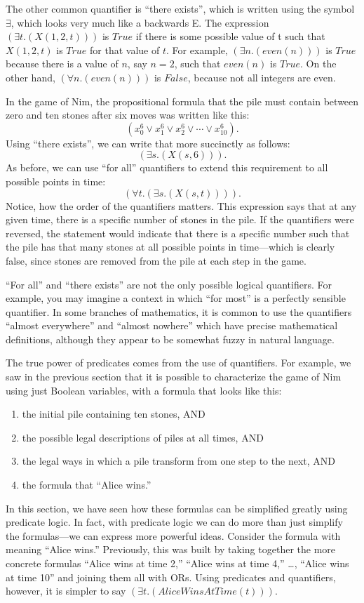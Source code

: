 {{The other common quantifier is ``there exists'', which is written using the symbol $\exists$, 
which looks very much like a backwards E. The expression $(\exists t.(X(1, 2, t)))$ 
is $True$ if there is some possible value of t such that $X(1, 2, t)$ is $True$ 
for that value of $t$. For example, $(\exists n.(even(n)))$ is $True$ because there 
is a value of $n$, say $n=2$, such that $even(n)$ is $True$. On the other hand, 
$(\forall n.(even(n)))$ is $False$, because not all integers are even.

In the game of Nim, the propositional formula that the pile must contain between zero and
ten stones after six moves was written like this:
$$(x_{0}^{6} \vee x_{1}^{6} \vee x_{2}^{6} \vee \cdots \vee x_{10}^{6}).$$
Using ``there exists'', we can write that more succinctly as follows:
$$(\exists s.(X(s, 6))).$$
As before, we can use ``for all'' quantifiers to extend this requirement to all possible
points in time:
$$(\forall t.(\exists s.(X(s, t)))).$$
Notice, how the order of the quantifiers matters. This expression says that at any given
time, there is a specific number of stones in the pile. If the quantifiers were reversed,
the statement would indicate that there is a specific number such that the pile has that
many stones at all possible points in time---which is clearly false, since stones are
removed from the pile at each step in the game.

\begin{aside}
``For all'' and ``there exists'' are not the only possible logical quantifiers. For example, you may imagine a context
in which ``for most'' is a perfectly sensible quantifier. In some branches of mathematics, it is common to use the
quantifiers ``almost everywhere'' and ``almost nowhere'' which have precise mathematical definitions, although they
appear to be somewhat fuzzy in natural language.
\end{aside}

The true power of predicates comes from the use of quantifiers. For example, we saw in the 
previous section that it
is possible to characterize the game of Nim using just Boolean variables, with a formula that looks like this:
\begin{enumerate}
\item the initial pile containing ten stones, AND
\item the possible legal descriptions of piles at all times, AND
\item the legal ways in which a pile transform from one step to the next, AND
\item the formula that ``Alice wins.''
\end{enumerate}
In this section, we have seen how these formulas can be simplified greatly using predicate logic. In fact, with predicate
logic we can do more than just simplify the formulas---we can express more powerful ideas. Consider the formula with
meaning ``Alice wins.'' Previously, this was built by taking together the more concrete formulas ``Alice wins at
time 2,'' ``Alice wins at time 4,'' \dots, ``Alice wins at time 10'' and joining them all with ORs. Using predicates
and quantifiers, however, it is simpler to say $(\exists t.(AliceWinsAtTime(t)))$.

}}
